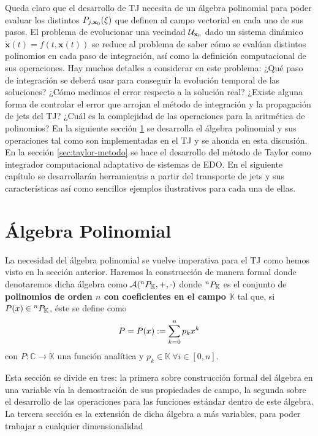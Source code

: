 Queda claro que el desarrollo de TJ necesita de un álgebra polinomial para poder evaluar los distintos $P_{j,\mathbf{x}_0}(\xi)$ que definen al campo vectorial en cada uno de sus pasos. El problema de evolucionar una vecindad $\mathcal{U}_{\mathbf{x}_0}$ dado un sistema dinámico $\dot{\mathbf{x}}(t) = f(t,\mathbf{x}(t))$ se reduce al problema de saber cómo se evalúan distintos polinomios en cada paso de integración, así como la definición computacional de sus operaciones. Hay muchos detalles a considerar en este problema: ¿Qué paso de integración se deberá usar para conseguir la evolución temporal de las soluciones? ¿Cómo medimos el error respecto a la solución real? ¿Existe alguna forma de controlar el error que arrojan el método de integración y la propagación de jets del TJ? ¿Cuál es la complejidad de las operaciones para la aritmética de polinomios? En la siguiente sección \ref{sec:alg_poli} se desarrolla el álgebra polinomial y sus operaciones tal como son implementadas en el TJ y se ahonda en esta discusión. En la sección \ref{sec:taylor-metodo} se hace el desarrollo del método de Taylor como integrador computacional adaptativo de sistemas de EDO. En el siguiente capítulo se desarrollarán herramientas a partir del transporte de jets y sus características así como sencillos ejemplos ilustrativos para cada una de ellas.


\section{Álgebra Polinomial}
\label{sec:alg_poli}

La necesidad del álgebra polinomial se vuelve imperativa para el TJ como hemos visto en la sección anterior. Haremos la construcción de manera formal donde denotaremos  dicha álgebra como $\mathcal{A}(^{n}P_{\mathbb{K}},+,\cdot)$ donde ${^{n}P_{\mathbb{K}}}$ es el conjunto de \textbf{polinomios de orden $n$ con coeficientes en el campo $\mathbb{K}$} tal que, si  $P(x) \in {^{n}P_{\mathbb{K}}}$, éste se define como
$$P = P(x) := \sum_{k=0}^n p_k x^k $$
con $P: \mathbb{C} \to \mathbb{K}$ una función analítica y $p_k \in \mathbb{K} \  \forall i \in [0,n]$.

Esta sección se divide en tres: la primera sobre construcción formal del álgebra en una variable vía la demostración de sus propiedades de campo, la segunda sobre el desarrollo de las operaciones para las funciones estándar dentro de este álgebra. La tercera sección es la extensión de dicha álgebra a más variables, para poder trabajar a cualquier dimensionalidad


